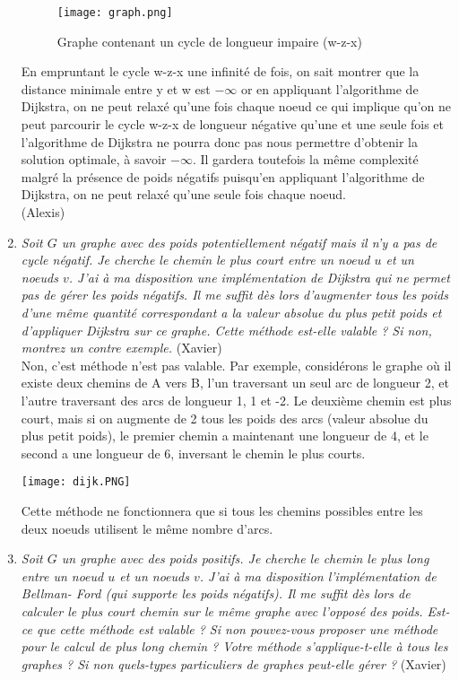\documentclass[11pt]{article}
\begin{document}
\begin{enumerate}
\begin{figure}[h!]
    \center
    \texttt{[image: graph.png]}
    \caption{Graphe contenant un cycle de longueur impaire (w-z-x)}
\end{figure}
En empruntant le cycle w-z-x une infinité de fois, on sait montrer que 
la distance minimale entre y et w est $ -\infty $ 
or en appliquant l'algorithme de Dijkstra, 
on ne peut relaxé qu'une fois chaque noeud ce qui implique qu'on ne peut parcourir
le cycle w-z-x de longueur négative qu'une et une seule fois et l'algorithme 
de Dijkstra ne pourra donc pas nous permettre d'obtenir la solution optimale,
 à savoir $ -\infty $. Il gardera toutefois la même complexité malgré la présence de poids négatifs puisqu'en appliquant 
 l'algorithme de Dijkstra, on ne peut relaxé qu'une seule fois chaque noeud.\\

(Alexis)\\

\item \textit{Soit $G$ un graphe avec des poids potentiellement négatif mais il n’y a pas de
cycle négatif. Je cherche le chemin le plus court entre un noeud $u$ et un noeuds $v$.
J’ai à ma disposition une implémentation de Dijkstra qui ne permet pas de gérer
les poids négatifs. Il me suffit dès lors d’augmenter tous les poids d’une même
quantité correspondant a la valeur absolue du plus petit poids et d’appliquer
Dijkstra sur ce graphe. Cette méthode est-elle valable ? Si non, montrez un contre
exemple.} (Xavier)\\

Non, c'est méthode n'est pas valable. Par exemple, considérons le graphe où il existe deux chemins de A vers B, l'un traversant un seul arc de longueur 2, et l'autre traversant des arcs de longueur 1, 1 et -2. Le deuxième chemin est plus court, mais si on augmente de 2 tous les poids des arcs (valeur absolue du plus petit poids), le premier chemin a maintenant une longueur de 4, et le second a une longueur de 6, inversant le chemin le plus courts.
\begin{center}
\texttt{[image: dijk.PNG]} 
\end{center}
Cette méthode ne fonctionnera que si tous les chemins possibles entre les deux noeuds utilisent le même nombre d'arcs.\\

\item \textit{Soit $G$ un graphe avec des poids positifs. Je cherche le chemin le plus long entre
un noeud $u$ et un noeuds $v$. J’ai à ma disposition l’implémentation de Bellman-
Ford (qui supporte les poids négatifs). Il me suffit dès lors de calculer le plus
court chemin sur le même graphe avec l’opposé des poids. Est-ce que cette méthode
est valable ? Si non pouvez-vous proposer une méthode pour le calcul de
plus long chemin ? Votre méthode s’applique-t-elle à tous les graphes ? Si non
quels-types particuliers de graphes peut-elle gérer ?} (Xavier)\\


\end{enumerate}
\end{document}
